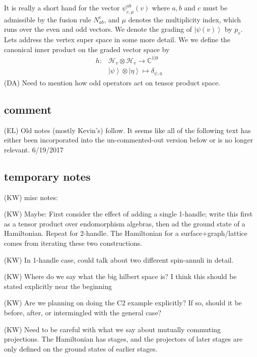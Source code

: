 \documentclass[12pt,a4paper]{article}
\newcounter{arrow}
\newcommand{\tp}{\otimes}
\newcommand{\kw}[1]{{\color{kwcolor}\footnotesize{(KW) #1}}}
\newcommand{\ket}[1]{\ensuremath{\left|#1\right\rangle}}
\newcommand{\dave}[1]{{\color{ao(english)}\footnotesize{(DA) #1}}}
\newcommand{\ethan}[1]{{\color{amethyst}\footnotesize{(EL) #1}}}
\begin{document}
It is really a short hand for the vector $\psi^{ab}_{c,\mu}(v)$ where $a,b$ and $c$ must be admissible by the fusion rule $N_{ab}^c$, and $\mu$ denotes the multiplicity index, which runs over the even and odd vectors.
We denote the grading of $\ket{\psi(v)}$ by $p_v$. 
Lets address the vertex super space in some more detail.
We we define the canonical inner product on the graded vector space by
\begin{align}
h: &\mathcal{H}_v \tp \mathcal{H}_v \rightarrow \mathbb{C}^{1|0}\\
     & \ket{\psi} \tp \ket{\eta} \mapsto \delta_{\psi, \eta}
\end{align}
\dave{Need to mention how odd operators act on tensor product space. }
 
 


 
\subsection{comment}
\ethan{Old notes (mostly Kevin's) follow. It seems like all of the following text has either been incorporated into the un-commented-out version below or is no longer relevant. 6/19/2017} 
\subsection{temporary notes}

\kw{misc notes:}

\kw{Maybe: First consider the effect of adding a single 1-handle; write this first as a tensor product over endomorphism
algebras, then ad the ground state of a Hamiltonian.  Repeat for 2-handle.  The Hamiltonian for a surface+graph/lattice
comes from iterating these two constructions.}

\kw{In 1-handle case, could talk about two different spin-annuli in detail.}

\kw{Where do we say what the big hilbert space is?  I think this should be stated explicitly near the beginning}

\kw{Are we planning on doing the C2 example explicitly?  
If so, should it be before, after, or intermingled with the general case?}

\kw{Need to be careful with what we say about mutually commuting projections.
The Hamiltonian has stages, and the projectors of later stages are only defined on the ground
states of earlier stages.}
\end{document}
